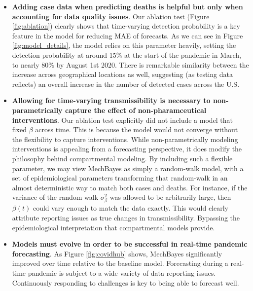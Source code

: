 \documentclass[11pt]{amsart}
\begin{document}
\begin{itemize}
\item \textbf{Adding case data when predicting deaths is helpful but only when accounting for data quality issues}. Our ablation test (Figure \ref{fig:ablation}) clearly shows that time-varying detection probability is a key feature in the model for reducing MAE of forecasts. As we can see in Figure \ref{fig:model_details}, the model relies on this parameter heavily, setting the detection probability at around 15\% at the start of the pandemic in March, to nearly 80\% by August 1st 2020. There is remarkable similarity between the increase across geographical locations as well, suggesting (as testing data reflects) an overall increase in the number of detected cases across the U.S. 

\item \textbf{Allowing for time-varying transmissibility is necessary to non-parametrically capture the effect of non-pharamceutical interventions}. Our ablation test explicitly did not include a model that fixed $\beta$ across time. This is because the model would not converge without the flexibility to capture interventions. While non-parametrically modeling interventions is appealing from a forecasting perspective, it does modify the philosophy behind compartmental modeling. By including such a flexible parameter, we may view MechBayes as simply a random-walk model, with a set of epidemiological parameters transforming that random-walk in an almost deterministic way to match both cases and deaths. For instance, if the variance of the random walk $\sigma_{\beta}^2$ was allowed to be arbitrarily large, then $\beta(t)$ could vary enough to match the data exactly. This would clearly attribute reporting issues as true changes in transmissibility. Bypassing the epidemiological interpretation that compartmental models provide. 

\item \textbf{Models must evolve in order to be successful in real-time pandemic forecasting}. As Figure \ref{fig:covidhub} shows, MechBayes significantly improved over time relative to the baseline model. Forecasting during a real-time pandemic is subject to a wide variety of data reporting issues. Continuously responding to challenges is key to being able to forecast well. 


\end{itemize}
\end{document}
